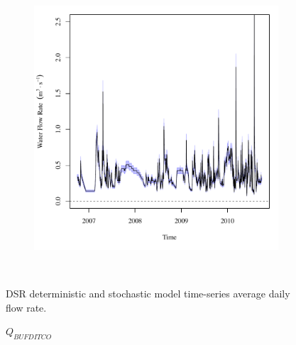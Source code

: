 \begin{linenumbers}
\begin{landscape}
\begin{figure}
\begin{subfigure}{0.7\textwidth}
		\end{subfigure}%
		\begin{subfigure}{0.7\textwidth}
			\centering
			\includegraphics[width=\tableCustomSize]{"Figures/Results_DSR/Stochastic/Q BIG"}
		\end{subfigure}\\
		\caption{DSR deterministic and stochastic model time-series average daily flow rate.}
	\end{figure}
\end{landscape}
\subfiguremid
\begin{landscape}
	\begin{figure}
		\centering
		$ Q_{BUFDITCO} $
		\begin{subfigure}{0.7\textwidth}
			\centering

\end{subfigure}
\end{figure}
\end{landscape}
\end{linenumbers}
